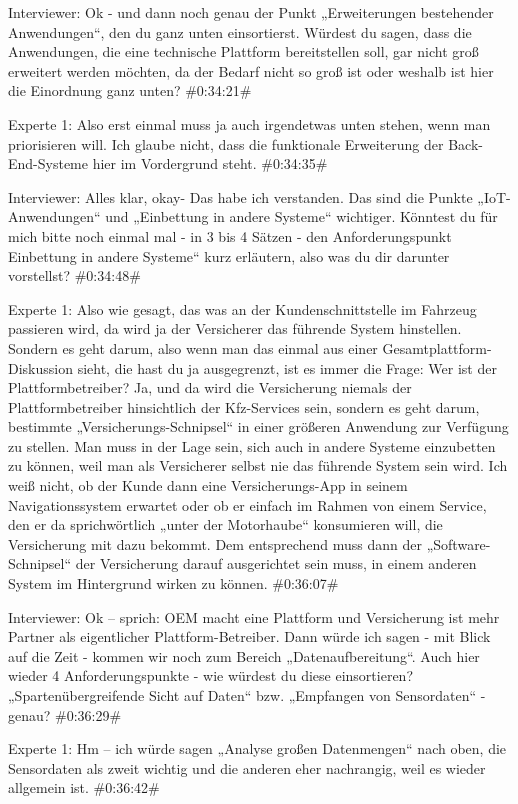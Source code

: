 Interviewer:
Ok - und dann noch genau der Punkt „Erweiterungen bestehender Anwendungen“, den du ganz unten einsortierst. Würdest du sagen, dass die Anwendungen, die eine technische Plattform bereitstellen soll, gar nicht groß erweitert werden möchten, da der Bedarf nicht so groß ist oder weshalb ist hier die Einordnung ganz unten?
\#0:34:21\#

Experte 1:
Also erst einmal muss ja auch irgendetwas unten stehen, wenn man priorisieren will. Ich glaube nicht, dass die funktionale Erweiterung der Back-End-Systeme hier im Vordergrund steht.
\#0:34:35\#

Interviewer:
Alles klar, okay- Das habe ich verstanden. Das sind die Punkte „IoT-Anwendungen“ und „Einbettung in andere Systeme“ wichtiger. Könntest du für mich bitte noch einmal mal - in 3 bis 4 Sätzen - den Anforderungspunkt Einbettung in andere Systeme“ kurz erläutern, also was du dir darunter vorstellst?
\#0:34:48\#

Experte 1:
Also wie gesagt, das was an der Kundenschnittstelle im Fahrzeug passieren wird, da wird ja der Versicherer das führende System hinstellen. Sondern es geht darum, also wenn man das einmal aus einer Gesamtplattform-Diskussion sieht, die hast du ja ausgegrenzt, ist es immer die Frage: Wer ist der Plattformbetreiber? Ja, und da wird die Versicherung niemals der Plattformbetreiber hinsichtlich der Kfz-Services sein, sondern es geht darum, bestimmte „Versicherungs-Schnipsel“ in einer größeren Anwendung zur Verfügung zu stellen. Man muss in der Lage sein, sich auch in andere Systeme einzubetten zu können, weil man als Versicherer selbst nie das führende System sein wird.
Ich weiß nicht, ob der Kunde dann eine Versicherungs-App in seinem Navigationssystem erwartet oder ob er einfach im Rahmen von einem Service, den er da sprichwörtlich „unter der Motorhaube“ konsumieren will, die Versicherung mit dazu bekommt. Dem entsprechend muss dann der „Software-Schnipsel“ der Versicherung darauf ausgerichtet sein muss, in einem anderen System im Hintergrund wirken zu können.
\#0:36:07\#

Interviewer:
Ok – sprich: OEM macht eine Plattform und Versicherung ist mehr Partner als eigentlicher Plattform-Betreiber. Dann würde ich sagen - mit Blick auf die Zeit - kommen wir noch zum Bereich „Datenaufbereitung“. Auch hier wieder 4 Anforderungspunkte - wie würdest du diese einsortieren? „Spartenübergreifende Sicht auf Daten“ bzw. „Empfangen von Sensordaten“ - genau?
\#0:36:29\#

Experte 1:
Hm – ich würde sagen „Analyse großen Datenmengen“ nach oben, die Sensordaten als zweit wichtig und die anderen eher nachrangig, weil es wieder allgemein ist.
\#0:36:42\#

